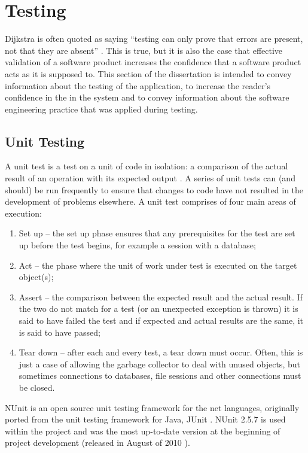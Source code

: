 \chapter{Testing}
\label{testing}
Dijkstra is often quoted as saying ``testing can only prove that errors are present, not that they are absent'' \cite{dijkstra}. This is true, but it is also the case that effective validation of a software product increases the confidence that a software product acts as it is supposed to.  This section of the dissertation is intended to convey information about the testing of the application, to increase the reader's confidence in the in the system and to convey information about the software engineering practice that was applied during testing.

\section{Unit Testing}
A unit test is a test on a unit of code in isolation: a comparison of the actual result of an operation with its expected output \cite{unitTesting}.  A series of unit tests can (and should) be run frequently to ensure that changes to code have not resulted in the development of problems elsewhere.  A unit test comprises of four main areas of execution:
\begin{enumerate}
	\item Set up -- the set up phase ensures that any prerequisites for the test are set up before the test begins, for example a session with a database;
	\item Act -- the phase where the unit of work under test is executed on the target object(s);
	\item Assert -- the comparison between the expected result and the actual result.  If the two do not match for a test (or an unexpected exception is thrown) it is said to have failed the test and if expected and actual results are the same, it is said to have passed;
	\item Tear down -- after each and every test, a tear down must occur.  Often, this is just a case of allowing the garbage collector to deal with unused objects, but sometimes connections to databases, file sessions and other connections must be closed.
\end{enumerate}

NUnit is an open source unit testing framework for the \gls{net} languages, originally ported from the unit testing framework for Java, JUnit \cite{nUnitHome}.  NUnit 2.5.7 is used within the project and was the most up-to-date version at the beginning of project development (released in August of 2010 \cite{nUnitRelease}).  

